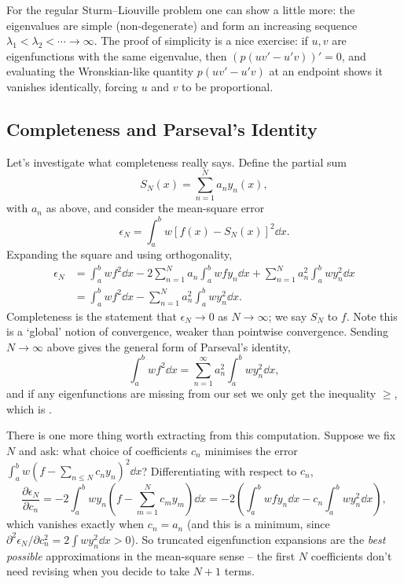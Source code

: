 \begin{remark}
    For the regular Sturm--Liouville problem one can show a little more: the eigenvalues are simple (non-degenerate) and form an increasing sequence $\lambda_1 < \lambda_2 < \cdots \rightarrow \infty$. The proof of simplicity is a nice exercise: if $u, v$ are eigenfunctions with the same eigenvalue, then $(p(uv' - u'v))' = 0$, and evaluating the Wronskian-like quantity $p(uv' - u'v)$ at an endpoint shows it vanishes identically, forcing $u$ and $v$ to be proportional.
\end{remark}

\subsection{Completeness and Parseval's Identity}

Let's investigate what completeness really says. Define the partial sum
$$
S_N(x) = \sum_{n = 1}^N a_n y_n(x),
$$
with $a_n$ as above, and consider the mean-square error
$$
\epsilon_N = \int_a^b w \left[f(x) - S_N(x)\right]^2 \dd x.
$$
Expanding the square and using orthogonality,
\begin{align*}
    \epsilon_N &= \int_a^b w f^2 \dd x - 2\sum_{n = 1}^N a_n \int_a^b w f y_n \dd x + \sum_{n = 1}^N a_n^2 \int_a^b w y_n^2 \dd x \\
    &= \int_a^b w f^2 \dd x - \sum_{n = 1}^N a_n^2 \int_a^b w y_n^2 \dd x.
\end{align*}
Completeness is the statement that $\epsilon_N \rightarrow 0$ as $N \rightarrow \infty$; we say $S_N$  to $f$. Note this is a `global' notion of convergence, weaker than pointwise convergence. Sending $N \to \infty$ above gives the general form of Parseval's identity,
$$
\int_a^b w f^2 \dd x = \sum_{n = 1}^{\infty} a_n^2 \int_a^b w y_n^2 \dd x,
$$
and if any eigenfunctions are missing from our set we only get the inequality $\geq$, which is .

There is one more thing worth extracting from this computation. Suppose we fix $N$ and ask: what choice of coefficients $c_n$ minimises the error $\int_a^b w (f - \sum_{n \leq N} c_n y_n)^2 \dd x$? Differentiating with respect to $c_n$,
$$
\frac{\partial \epsilon_N}{\partial c_n} = -2 \int_a^b w y_n \left(f - \sum_{m = 1}^N c_m y_m \right) \dd x = -2\left(\int_a^b w f y_n \dd x - c_n \int_a^b w y_n^2 \dd x\right),
$$
which vanishes exactly when $c_n = a_n$ (and this is a minimum, since $\partial^2 \epsilon_N / \partial c_n^2 = 2 \int w y_n^2 \dd x > 0$). So truncated eigenfunction expansions are the \emph{best possible} approximations in the mean-square sense -- the first $N$ coefficients don't need revising when you decide to take $N + 1$ terms.

